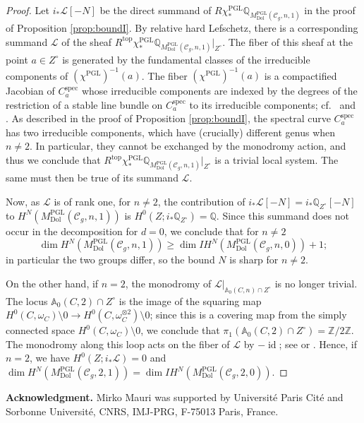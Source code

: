 \documentclass[11pt,reqno]{amsart}
\theoremstyle{plain} %
\theoremstyle{definition}
\newcommand{\QQ}{\mathbb{Q}}
\newcommand{\C}{\mathcal{C}}
\newcommand{\ZZ}{\mathbb{Z}}
\DeclareMathOperator{\PGL}{PGL}
\DeclareMathOperator{\id}{id}
\newcommand{\Dol}{\mathrm{Dol}}
\newcommand{\IH}{I\!H}
\renewcommand{\AA}{\mathbb{A}}
\DeclareMathOperator{\spec}{spec}
\begin{document}
\begin{proof} 
 Let $i_* \mathcal{L}[-N]$ be the direct summand of $R \chi^{\PGL}_* \QQ_{M^{\PGL}_{\Dol}(\C_g,n,1)}$ in the proof of Proposition \ref{prop:boundI}. By relative hard Lefschetz, there is a corresponding summand $\mathcal{L}$ of the sheaf $R^{\textrm{top}}\chi_*^{\PGL} \QQ_{M^{\PGL}_{\Dol}(\C_g,n,1)}|_{Z^\circ}$. The fiber of this sheaf at the point $a \in Z^\circ$ is generated by the fundamental classes of the irreducible components of $(\chi^{\PGL})^{-1}(a)$. 
The fiber $(\chi^{\PGL})^{-1}(a)$ is a compactified Jacobian of $C^{\spec}_{a}$ whose irreducible components are indexed by the degrees of the restriction of a stable line bundle on $C^{\spec}_a$ to its irreducible components; cf.~\cite[\S 4]{dCHM2021} and \cite[Proposition 7.6.(ii)]{MMP2023}. As described in the proof of Proposition \ref{prop:boundI}, the spectral curve $C^{\spec}_a$ has two irreducible components, which have (crucially) different genus when $n \neq 2$. 
In particular, they cannot be exchanged by the monodromy action, and thus we conclude that $R^{\mathrm{top}}\chi_*^{\PGL} \QQ_{M^{\PGL}_{\Dol}(\C_g,n,1)}|_{Z^\circ}$ is a trivial local system. The same must then be true of its summand $\mathcal{L}$.

Now, as $\mathcal{L}$ is of rank one, for $n \neq 2$, the contribution of $i_* \mathcal{L}[-N] = i_* \QQ_{Z^\circ}[-N]$ to $H^N(M^{\PGL}_{\Dol}(\C_g,n,1))$ is $H^0(Z; i_* \QQ_{Z^\circ}) = \QQ$. Since this summand does not occur in the decomposition for $d=0$, we conclude that for $n \neq 2$
$$\dim H^{N}(M^{\PGL}_{\Dol}(\C_g,n,1)) \geq \dim \IH^{N}(M^{\PGL}_{\Dol}(\C_g,n,0))+1;$$
in particular the two groups differ, so the bound $N$ is sharp for $n \neq 2$.

On the other hand, if $n=2$, the monodromy of $\mathcal{L}|_{\AA_{0}(C, n) \cap Z^{\circ}}$ is no longer trivial. The locus $\AA_0(C,2) \cap Z^\circ$ is the image of the squaring map $H^{0}(C, \omega_C)\setminus 0 \to H^{0}(C, \omega^{\otimes 2}_C) \setminus 0$; since this is a covering map from the simply connected space $H^0(C, \omega_C) \setminus 0$, we conclude that $\pi_1(\AA_0(C,2) \cap Z^\circ)=\ZZ/2\ZZ$. The monodromy along this loop acts on the fiber of $\mathcal{L}$ by $-\id$; see \cite[Corollary 6.20]{dCFHM} or \cite[Theorem 1.6]{MMP2023}. Hence, if $n=2$, we have $H^0(Z; i_* \mathcal{L}) = 0$ and
$\dim H^{N}(M^{\PGL}_{\Dol}(\C_g,2,1)) = \dim \IH^{N}(M^{\PGL}_{\Dol}(\C_g,2,0)).$
\end{proof} 

\noindent\textbf{Acknowledgment.} Mirko Mauri was supported by Université Paris Cité and Sorbonne Université, CNRS, IMJ-PRG, F-75013 Paris, France. 
\end{document}
